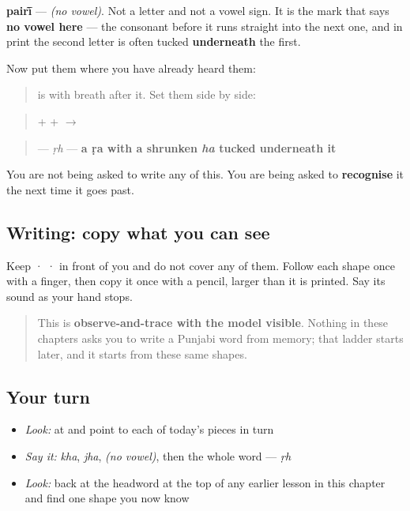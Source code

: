 \textbf{pairī̃} — \emph{(no vowel)}. Not a letter and not a vowel sign. It is the mark that says \textbf{no vowel here} — the consonant before it runs straight into the next one, and in print the second letter is often tucked \textbf{underneath} the first.

Now put them where you have already heard them:

\begin{quote}
\textbf{} is \textbf{} with breath after it. Set them side by side: \textbf{}  \textbf{}
\end{quote}

\begin{quote}
\textbf{} + \textbf{} + \textbf{} $\to$ \textbf{}
\end{quote}

\begin{quote}
\textbf{} — \emph{ṛh} — \textbf{a ṛa with a shrunken \emph{ha} tucked underneath it}
\end{quote}

You are not being asked to write any of this. You are being asked to \textbf{recognise} it the next time it goes past.

\subsection*{Writing: copy what you can see}
Keep  ·  ·  in front of you and do not cover any of them. Follow each shape once with a finger, then copy it once with a pencil, larger than it is printed. Say its sound as your hand stops.

\begin{quote}
This is \textbf{observe-and-trace with the model visible}. Nothing in these chapters asks you to write a Punjabi word from memory; that ladder starts later, and it starts from these same shapes.
\end{quote}

\subsection*{Your turn}
\begin{itemize}
\raggedright
  \item \emph{Look:} at \textbf{} and point to each of today's pieces in turn
  \item \emph{Say it:} \emph{kha}, \emph{jha}, \emph{(no vowel)}, then the whole word — \emph{ṛh}
  \item \emph{Look:} back at the headword at the top of any earlier lesson in this chapter and find one shape you now know
\end{itemize}

